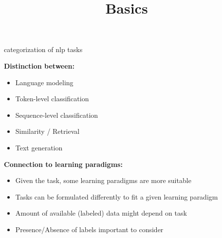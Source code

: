 


\newcommand*\POS[1]{\textsubscript{\texttt{#1}}} %
\usepackage{qtree} %

\newcommand{\titlefigure}{figure/tasks.png}
\newcommand{\learninggoals}{
\item Understand the different types of tasks
\item Linguistic tasks vs. higher-level tasks}

\title{Basics}
\date{}




\begin{vbframe}{categorization of nlp tasks}

\vfill

\textbf{Distinction between:}

	\begin{itemize}
		\item Language modeling
		\item Token-level classification
		\item Sequence-level classification
		\item Similarity / Retrieval
		\item Text generation
	\end{itemize}
	
\vspace{.3cm}

\textbf{Connection to learning paradigms:}

	\begin{itemize}
		\item Given the task, some learning paradigms are more suitable
		\item Tasks can be formulated differently to fit a given learning paradigm
		\item Amount of available (labeled) data might depend on task
		\item Presence/Absence of labels important to consider
	\end{itemize}

\vfill

\end{vbframe}



